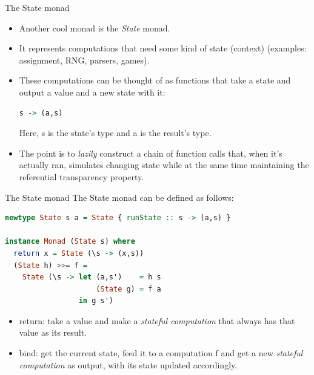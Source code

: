 \documentclass{beamer}
\begin{document}
\begin{frame}[fragile]{The State monad}
    \begin{itemize}
        \item Another cool monad is the \textit{State} monad.
        \item It represents computations that need some kind of state
              (context) (examples: assignment, RNG, parsers, games).
        \item These computations can be thought of as functions that
              take a state and output a value and a new state with it:

        \begin{minipage}{\linewidth} \hspace{1cm}
        \begin{lstlisting}[language=haskell, numbers=none, frame=none]
               s -> (a,s)
        \end{lstlisting}
        \end{minipage} \hspace{1cm}

             Here, s is the state's type and a is the result's type.
        \item The point is to \textit{lazily} construct a chain of
              function calls that, when it's actually ran, simulates
              changing state while at the same time maintaining the
              referential transparency property.
    \end{itemize}
\end{frame}

\begin{frame}[fragile]{The State monad}
    The State monad can be defined as follows:

    \begin{minipage}{\linewidth} \hspace{1cm}
    \begin{lstlisting}[language=haskell, numbers=none, frame=none]
newtype State s a = State { runState :: s -> (a,s) }

instance Monad (State s) where
  return x = State (\s -> (x,s))
  (State h) >>= f =
    State (\s -> let (a,s')    = h s
                     (State g) = f a
                 in g s')
    \end{lstlisting}
    \end{minipage} \hspace{1cm}

    \begin{itemize}
        \item return: take a value and make a \textit{stateful computation}
              that always has that value as its result.
        \item bind: get the current state, feed it to a computation f and
              get a new \textit{stateful computation} as output, with its
              state updated accordingly.
    \end{itemize}
\end{frame}
\end{document}

